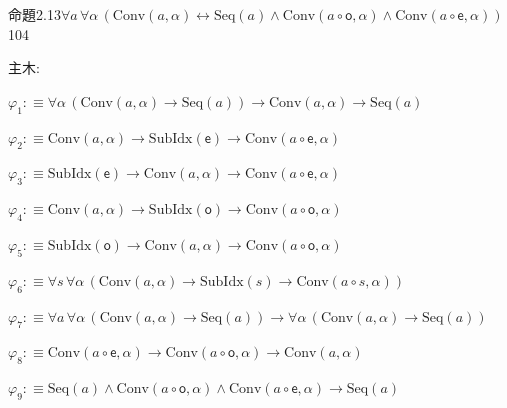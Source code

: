 \begin{fullproof}{命題2.13}{$\forall a\,\forall \alpha\,(\mathrm{Conv}(a,\alpha) \leftrightarrow \mathrm{Seq}(a) \land \mathrm{Conv}(a \circ \mathsf{o},\alpha) \land \mathrm{Conv}(a \circ \mathsf{e},\alpha))$}{104}
\begin{ptree}
\noLine
{}
\noLine
{}
\end{ptree}
\noindent 主木:
\begin{ptree}
\noLine
{}
\noLine
{}
\end{ptree}
\begin{abbrevlist}
\item $\varphi_{1} :\equiv \forall \alpha\,(\mathrm{Conv}(a,\alpha) \to \mathrm{Seq}(a)) \to \mathrm{Conv}(a,\alpha) \to \mathrm{Seq}(a)$
\item $\varphi_{2} :\equiv \mathrm{Conv}(a,\alpha) \to \mathrm{SubIdx}(\mathsf{e}) \to \mathrm{Conv}(a \circ \mathsf{e},\alpha)$
\item $\varphi_{3} :\equiv \mathrm{SubIdx}(\mathsf{e}) \to \mathrm{Conv}(a,\alpha) \to \mathrm{Conv}(a \circ \mathsf{e},\alpha)$
\item $\varphi_{4} :\equiv \mathrm{Conv}(a,\alpha) \to \mathrm{SubIdx}(\mathsf{o}) \to \mathrm{Conv}(a \circ \mathsf{o},\alpha)$
\item $\varphi_{5} :\equiv \mathrm{SubIdx}(\mathsf{o}) \to \mathrm{Conv}(a,\alpha) \to \mathrm{Conv}(a \circ \mathsf{o},\alpha)$
\item $\varphi_{6} :\equiv \forall s\,\forall \alpha\,(\mathrm{Conv}(a,\alpha) \to \mathrm{SubIdx}(s) \to \mathrm{Conv}(a \circ s,\alpha))$
\item $\varphi_{7} :\equiv \forall a\,\forall \alpha\,(\mathrm{Conv}(a,\alpha) \to \mathrm{Seq}(a)) \to \forall \alpha\,(\mathrm{Conv}(a,\alpha) \to \mathrm{Seq}(a))$
\item $\varphi_{8} :\equiv \mathrm{Conv}(a \circ \mathsf{e},\alpha) \to \mathrm{Conv}(a \circ \mathsf{o},\alpha) \to \mathrm{Conv}(a,\alpha)$
\item $\varphi_{9} :\equiv \mathrm{Seq}(a) \land \mathrm{Conv}(a \circ \mathsf{o},\alpha) \land \mathrm{Conv}(a \circ \mathsf{e},\alpha) \to \mathrm{Seq}(a)$

\end{abbrevlist}
\end{fullproof}
